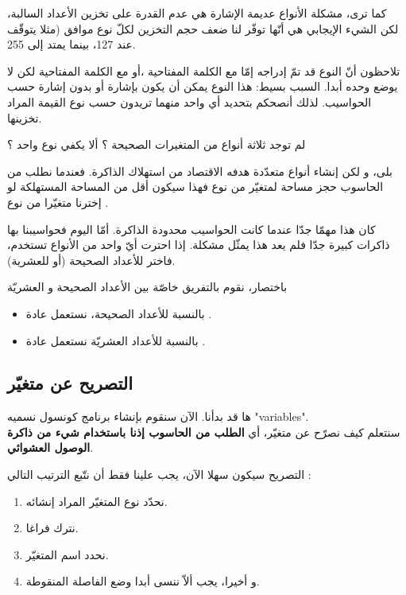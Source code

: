كما ترى، مشكلة الأنواع عديمة الإشارة هي عدم القدرة على تخزين الأعداد السالبة، لكن الشيء الإيجابي هي أنّها توفّر لنا ضعف حجم التخزين لكلّ نوع موافق (مثلا
يتوقّف عند 127، بينما
يمتد إلى 255.

\begin{information}
  تلاحظون أنّ النوع
قد تمّ إدراجه إمّا مع الكلمة المفتاحية
،أو مع الكلمة المفتاحية
لكن لا يوضع وحده أبدا. السبب بسيط: هذا النوع يمكن أن يكون بإشارة أو بدون إشارة حسب الحواسيب. لذلك أنصحكم بتحديد أي واحد منهما تريدون حسب نوع القيمة المراد تخزينها.
\end{information}

\begin{question}
  لم توجد ثلاثة أنواع من المتغيرات الصحيحة ؟ ألا يكفي نوع واحد ؟
\end{question}

بلى، و لكن إنشاء أنواع متعدّدة هدفه الاقتصاد من استهلاك الذاكرة. فعندما نطلب من الحاسوب حجز مساحة لمتغيّر من نوع
فهذا سيكون أقل من المساحة المستهلكة لو إخترنا متغيّرا من نوع
.

كان هذا مهمّا جدّا عندما كانت الحواسيب محدودة الذاكرة. أمّا اليوم فحواسيبنا بها ذاكرات كبيرة جدّا فلم يعد هذا يمثّل مشكلة. إذا احترت أيّ واحد من الأنواع تستخدم، فاختر
للأعداد الصحيحة (أو
للعشرية).

باختصار، نقوم بالتفريق خاصّة بين الأعداد الصحيحة و العشريّة
\begin{itemize}
  \item بالنسبة للأعداد الصحيحة، نستعمل عادة
.
  \item بالنسبة للأعداد العشريّة نستعمل عادة
.
\end{itemize}

\subsection{التصريح عن متغيّر}
ها قد بدأنا. الآن سنقوم بإنشاء برنامج كونسول نسميه "\textenglish{variables}".\\
 سنتعلم كيف نصرّح عن متغيّر، أي
 \textbf{الطلب من الحاسوب إذنا باستخدام شيء من ذاكرة الوصول العشوائي}.

 التصريح سيكون سهلا الآن، يجب علينا فقط أن نتّبع الترتيب التالي :
 \begin{enumerate}
   \item نحدّد نوع المتغيّر المراد إنشائه.
   \item نترك فراغا.
   \item نحدد اسم المتغيّر.
   \item و أخيرا، يجب ألاّ ننسى أبدا وضع الفاصلة المنقوطة.
 \end{enumerate}

